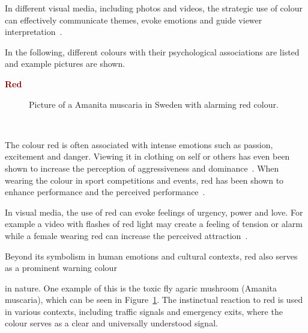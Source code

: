 \documentclass[../MasterThesis.tex]{subfiles}
\begin{document}
In different visual media, including photos and videos, the strategic use of colour can effectively communicate themes, evoke emotions and guide viewer interpretation~\cite{cc_cg_1, cc_cg_2, colour, colour2}.


In the following, different colours with their psychological associations are listed and example pictures are shown.



\textbf{\textcolor{Maroon}{Red}}

%
%

\begin{minipage}{0.5\textwidth}
	\begin{figure}[H]
		\begin{center}
			\caption[Picture of an Amanita muscaria in Sweden with alarming red colour.]{Picture of a Amanita muscaria in Sweden with alarming red colour.}
			\label{figure:red}
		\end{center}
	\end{figure}
 \hfill
\end{minipage}\begin{minipage}{0.05\textwidth}
	\ 
\end{minipage}\begin{minipage}{0.45\textwidth}
	The colour red is often associated with intense emotions such as passion, excitement and danger. Viewing it in clothing on self or others has even been shown to increase the perception of aggressiveness and dominance~\cite{red_dominance}. When wearing the colour in sport competitions and events, red has been shown to enhance performance and the perceived performance~\cite{colour, red_sport}.
	
	In visual media, the use of red can evoke feelings of urgency, power and love. For example a video with flashes of red light may create a feeling of tension or alarm while a female wearing red can increase the perceived attraction~\cite{colour, red_romance}.
	
	Beyond its symbolism in human emotions and cultural contexts, red also serves as a prominent warning colour 
	
\end{minipage}

\vspace*{-0.9em}
in nature. One example of this is the toxic fly agaric mushroom (Amanita muscaria), which can be seen in Figure~\ref{figure:red}.
The instinctual reaction to red is used in various contexts, including traffic signals and emergency exits, where the colour serves as a clear and universally understood signal.
\end{document}
